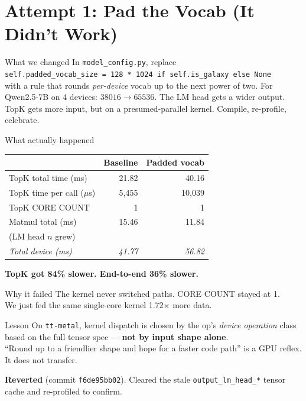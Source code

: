 \documentclass[aspectratio=169,10pt]{beamer}
\begin{document}
\section{Attempt 1: Pad the Vocab (It Didn't Work)}

\begin{frame}{What we changed}
  In \texttt{model\_config.py}, replace\\[0.3em]
  \texttt{self.padded\_vocab\_size = 128 * 1024 if self.is\_galaxy else None}\\[0.3em]
  with a rule that rounds \emph{per-device} vocab up to the next power of two.
  For Qwen2.5-7B on 4 devices: $38016 \to 65536$.
  \vfill
  The LM head gets a wider output. TopK gets more input, but on a
  presumed-parallel kernel. Compile, re-profile, celebrate.
\end{frame}

\begin{frame}{What actually happened}
  \centering
  \small
  \begin{tabular}{lrr}
    \toprule
     & Baseline & Padded vocab \\
    \midrule
    TopK total time (ms)         & 21.82  & \alert{40.16} \\
    TopK time per call ($\mu$s)  & 5{,}455 & \alert{10{,}039} \\
    TopK CORE COUNT              &  1     & \alert{1}     \\
    Matmul total (ms)            & 15.46  & 11.84         \\
    (LM head $n$ grew)           &        &               \\
    \midrule
    \emph{Total device (ms)}     & \emph{41.77} & \alert{\emph{56.82}} \\
    \bottomrule
  \end{tabular}
  \vfill
  \textbf{TopK got 84\% slower. End-to-end 36\% slower.}
\end{frame}

\begin{frame}{Why it failed}
  The kernel \alert{never switched paths}. CORE COUNT stayed at 1.\\[0.5em]
  We just fed the same single-core kernel 1.72$\times$ more data.
  \vfill
  \begin{block}{Lesson}
    On \texttt{tt-metal}, kernel dispatch is chosen by the op's
    \emph{device operation} class based on the full tensor spec ---
    \textbf{not by input shape alone}.\\[0.5em]
    ``Round up to a friendlier shape and hope for a faster code path''
    is a GPU reflex. It does not transfer.
  \end{block}
  \vfill
  \textbf{Reverted} (commit \texttt{f6de95bb02}). Cleared the stale
  \texttt{output\_lm\_head\_*} tensor cache and re-profiled to confirm.
\end{frame}
\end{document}
